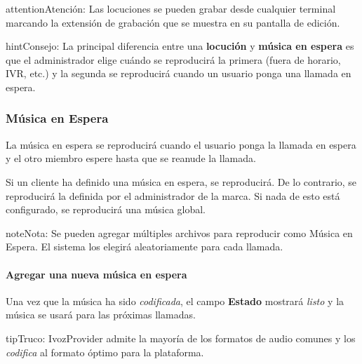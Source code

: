 \documentclass[letterpaper,10pt,spanish]{sphinxmanual}
\begin{document}
\begin{notice}{attention}{Atención:}
Las locuciones se pueden grabar desde cualquier terminal marcando la extensión de grabación que se muestra en su pantalla de edición.
\end{notice}

\begin{notice}{hint}{Consejo:}
La principal diferencia entre una \textbf{locución} y \textbf{música en espera} es que el administrador elige cuándo se reproducirá la primera (fuera de horario, IVR, etc.) y la segunda se reproducirá cuando un usuario ponga una llamada en espera.
\end{notice}
\label{administration_portal/client/vpbx/multimedia/music_on_hold:musiconhold}

\subsubsection{Música en Espera}
\label{administration_portal/client/vpbx/multimedia/music_on_hold:music-on-hold}\label{administration_portal/client/vpbx/multimedia/music_on_hold::doc}\label{administration_portal/client/vpbx/multimedia/music_on_hold:musiconhold}\label{administration_portal/client/vpbx/multimedia/music_on_hold:id1}
La música en espera se reproducirá cuando el usuario ponga la llamada en espera y el otro miembro espere hasta que se reanude la llamada.

Si un cliente ha definido una música en espera, se reproducirá. De lo contrario, se reproducirá la definida por el administrador de la marca. Si nada de esto está configurado, se reproducirá una música global.

\begin{notice}{note}{Nota:}
Se pueden agregar múltiples archivos para reproducir como Música en Espera. El sistema los elegirá aleatoriamente para cada llamada.
\end{notice}
\paragraph{Agregar una nueva música en espera}

Una vez que la música ha sido \emph{codificada}, el campo \textbf{Estado} mostrará \emph{listo} y la música se usará para las próximas llamadas.

\begin{notice}{tip}{Truco:}
IvozProvider admite la mayoría de los formatos de audio comunes y los \emph{codifica} al formato óptimo para la plataforma.
\end{notice}
\end{document}
